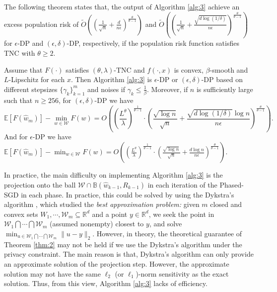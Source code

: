 \documentclass[12pt]{alt2022} %
\renewcommand{\tilde}{\widetilde}
\begin{document}

The following theorem states that,  the output of Algorithm \ref{alg:3} achieve an excess population risk of $\tilde{O}((\frac{1}{\sqrt{n}}+\frac{d}{n\epsilon})^\frac{\theta}{\theta-1}) $ and $\tilde{O}((\frac{1}{\sqrt{n}}+\frac{\sqrt{d\log(1/\delta)}}{n\epsilon})^\frac{\theta}{\theta-1})$ for $\epsilon$-DP and $(\epsilon, \delta)$-DP, respectively, if the population risk function satisfies TNC with $\theta\geq 2$.  
\begin{theorem}\label{thm:2}
Assume that $F(\cdot)$ satisfies $(\theta, \lambda)$-TNC and $f(\cdot, x)$ is  convex, $\beta$-smooth and $L$-Lipschitz for each $x$. Then Algorithm \ref{alg:3} is $\epsilon$-DP or $(\epsilon,\delta)$-DP based on different stepsizes $\{\gamma_k\}_{k=1}^m$  and noises if $\gamma_k\leq \frac{1}{\beta}$. Moreover, if $n$ is sufficiently large such that $n\geq256$, for $(\epsilon,\delta)$-DP we have 
		\begin{equation*}
\mathbb{E}[F(\hat{w}_m)]-\min_{w\in \mathcal{W}}F(w)= O\left(\left(\frac{L^\theta}{\lambda}\right)^{\frac{1}{\theta-1}}\cdot\left(\frac{\sqrt{\log n}}{\sqrt{n}}+\frac{\sqrt{d\log(1/\delta)}\log n}{n\epsilon}\right)^{\frac{\theta}{\theta-1}}\right).
\end{equation*}
And for $\epsilon$-DP we have 
$\mathbb{E}[F(\hat{w}_m)]-\min_{w\in \mathcal{W}}F(w)= O\left(\left(\frac{L^\theta}{\lambda}\right)^{\frac{1}{\theta-1}}\cdot\left(\frac{\sqrt{\log n}}{\sqrt{n}}+\frac{d\log n}{n\epsilon}\right)^{\frac{\theta}{\theta-1}}\right).$
\end{theorem} 	
In practice, the main difficulty on implementing Algorithm \ref{alg:3} is the projection onto the ball $\mathcal{W}\cap \mathbb{B}(\hat{w}_{k-1},R_{k-1})$ in each iteration of the Phased-SGD in each phase. In practice, this could be solved by using the Dykstra’s algorithm \citep{dykstra1983algorithm,boyle1986method}, which studied the \emph{best approximation problem:} given $m$ closed and convex sets $W_1, \cdots, \mathcal{W}_m \subseteq \mathbb{R}^d$ and a point $y\in \mathbb{R}^d$, we seek the point in $\mathcal{W}_1\bigcap \cdots \bigcap \mathcal{W}_m$ (assumed nonempty) closest to $y$, and solve
 $\min_{u\in \mathcal{W}_1\bigcap \cdots \bigcap \mathcal{W}_m} \|u-y\|_2.$ 
However, in theory, the theoretical guarantee of Theorem \ref{thm:2} may not be held if we use the  Dykstra’s algorithm under the privacy constraint. The main reason is that, Dykstra’s algorithm can only provide an approximate solution of the projection step. However, the approximate solution may not have the same $\ell_2$ (or $\ell_1$)-norm sensitivity as the exact solution. Thus, from this view, Algorithm \ref{alg:3} lacks of efficiency. 
\end{document}
